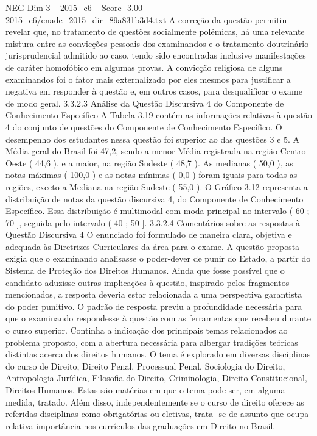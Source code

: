 \begin{textsample}{NEG Dim 3 – 2015\_c6 – Score -3.00 – 2015\_c6/enade\_2015\_dir\_89a831b3d4.txt}
A correção da questão permitiu revelar que, no tratamento de questões socialmente polêmicas, há uma relevante mistura entre as convicções pessoais dos examinandos e o tratamento doutrinário-jurisprudencial admitido ao caso, tendo sido encontradas inclusive manifestações de caráter homofóbico em algumas provas.
A convicção religiosa de alguns examinandos foi o fator mais externalizado por eles mesmos para justificar a negativa em responder à questão e, em outros casos, para desqualificar o exame de modo geral. 3.3.2.3 Análise da Questão Discursiva 4 do Componente de Conhecimento Específico A Tabela 3.19 contém as informações relativas à questão 4 do conjunto de questões do Componente de Conhecimento Específico.
O desempenho dos estudantes nessa questão foi superior ao das questões 3 e 5.
A Média geral do Brasil foi 47,2, sendo a menor Média registrada na região Centro-Oeste ( 44,6 ), e a maior, na região Sudeste ( 48,7 ).
As medianas ( 50,0 ), as notas máximas ( 100,0 ) e as notas mínimas ( 0,0 ) foram iguais para todas as regiões, exceto a Mediana na região Sudeste ( 55,0 ).
O Gráfico 3.12 representa a distribuição de notas da questão discursiva 4, do Componente de Conhecimento Específico.
Essa distribuição é multimodal com moda principal no intervalo ( 60 ; 70 ], seguida pelo intervalo ( 40 ; 50 ]. 3.3.2.4 Comentários sobre as respostas à Questão Discursiva 4 O enunciado foi formulado de maneira clara, objetiva e adequada às Diretrizes Curriculares da área para o exame.
A questão proposta exigia que o examinando analisasse o poder-dever de punir do Estado, a partir do Sistema de Proteção dos Direitos Humanos.
Ainda que fosse possível que o candidato aduzisse outras implicações à questão, inspirado pelos fragmentos mencionados, a resposta deveria estar relacionada a uma perspectiva garantista do poder punitivo.
O padrão de resposta previu a profundidade necessária para que o examinando respondesse à questão com as ferramentas que recebeu durante o curso superior.
Continha a indicação dos principais temas relacionados ao problema proposto, com a abertura necessária para albergar tradições teóricas distintas acerca dos direitos humanos.
O tema é explorado em diversas disciplinas do curso de Direito, Direito Penal, Processual Penal, Sociologia do Direito, Antropologia Jurídica, Filosofia do Direito, Criminologia, Direito Constitucional, Direitos Humanos.
Estas são matérias em que o tema pode ser, em alguma medida, tratado.
Além disso, independentemente se o curso de direito oferece as referidas disciplinas como obrigatórias ou eletivas, trata -se de assunto que ocupa relativa importância nos currículos das graduações em Direito no Brasil.

\end{textsample}
